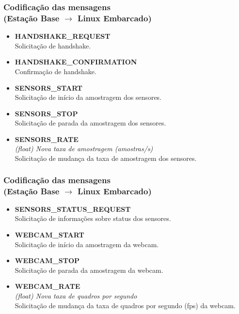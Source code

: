 \documentclass{beamer}
\begin{document}
    \begin{frame}
    \frametitle{Codificação das mensagens\\ (Estação Base $\rightarrow$ Linux Embarcado)}
		\begin{itemize}
		\item \textbf{HANDSHAKE\_REQUEST}\\
		Solicitação de handshake.

		\item \textbf{HANDSHAKE\_CONFIRMATION}\\
		Confirmação de handshake.

		\item \textbf{SENSORS\_START}\\
		Solicitação de início da amostragem dos sensores.

		\item \textbf{SENSORS\_STOP}\\
		Solicitação de parada da amostragem dos sensores.

		\item \textbf{SENSORS\_RATE} \\
		\textit{(float) Nova taxa de amostragem (amostras/s)}\\
		Solicitação de mudança da taxa de amostragem dos sensores.
		
		\end{itemize}
	\end{frame}
	\begin{frame}
	\frametitle{Codificação das mensagens\\ (Estação Base $\rightarrow$ Linux Embarcado)}
		\begin{itemize}

		\item \textbf{SENSORS\_STATUS\_REQUEST}\\
		Solicitação de informações sobre status dos sensores.

		\item \textbf{WEBCAM\_START}\\
		Solicitação de início da amostragem da webcam.

		\item \textbf{WEBCAM\_STOP}\\
		Solicitação de parada da amostragem da webcam.

		\item \textbf{WEBCAM\_RATE} \\
		\textit{(float) Nova taxa de quadros por segundo}\\
		Solicitação de mudança da taxa de quadros por segundo (fps) da webcam.
		
		\end{itemize}
	\end{frame}
\end{document}
